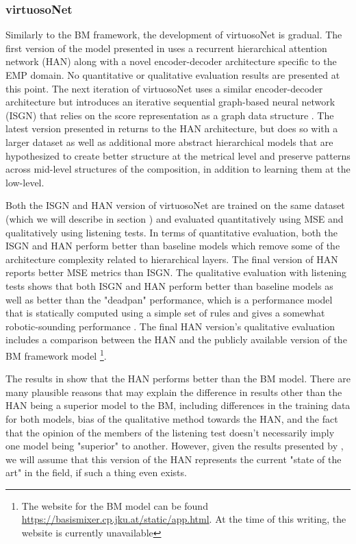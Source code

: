 \subsubsection{virtuosoNet}
Similarly to the BM framework, the development of virtuosoNet is gradual. The first version of the model presented in \cite{jeong2018virtuosonet} uses a recurrent hierarchical attention network (HAN) along with a novel encoder-decoder architecture specific to the EMP domain. No quantitative or qualitative evaluation results are presented at this point. The next iteration of virtuosoNet uses a similar encoder-decoder architecture but introduces an iterative sequential graph-based neural network (ISGN) that relies on the score representation as a graph data structure \cite{jeong2019graph}. The latest version presented in \cite{jeong2019virtuosonet} returns to the HAN architecture, but does so with a larger dataset as well as additional more abstract hierarchical models that are hypothesized to create better structure at the metrical level and preserve patterns across mid-level structures of the composition, in addition to learning them at the low-level.  

Both the ISGN\cite{jeong2019graph} and HAN\cite{jeong2019virtuosonet} version of virtuosoNet are trained on the same dataset (which we will describe in section ) and evaluated quantitatively using MSE and qualitatively using listening tests. In terms of quantitative evaluation, both the ISGN and HAN perform better than baseline models which remove some of the architecture complexity related to hierarchical layers. The final version of HAN reports better MSE metrics than ISGN. The qualitative evaluation with listening tests shows that both ISGN and HAN perform better than baseline models as well as better than the "deadpan" performance, which is a performance model that is statically computed using a simple set of rules and gives a somewhat robotic-sounding performance . The final HAN version's qualitative evaluation includes a comparison between the HAN and the publicly available version of the BM framework model \footnote{The website for the BM model can be found \href{here}{https://basismixer.cp.jku.at/static/app.html}. At the time of this writing, the website is currently unavailable}. 

The results in \cite{jeong2019virtuosonet} show that the HAN performs better than the BM model. There are many plausible reasons that may explain the difference in results other than the HAN being a superior model to the BM, including differences in the training data for both models, bias of the qualitative method towards the HAN, and the fact that the opinion of the members of the listening test doesn't necessarily imply one model being "superior" to another. However, given the results presented by \citet{jeong2019virtuosonet}, we will assume that this version of the HAN represents the current "state of the art" in the field, if such a thing even exists. 

